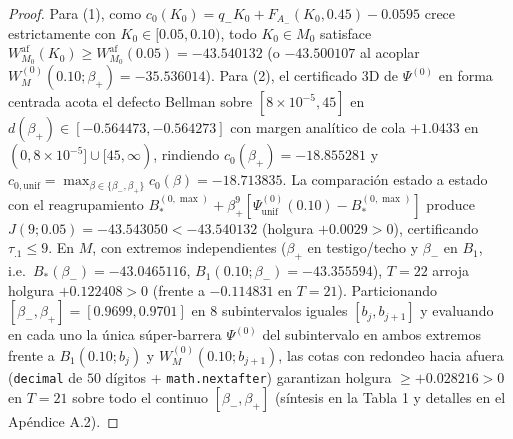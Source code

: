 \documentclass[11pt,letterpaper]{article}
\theoremstyle{plain}
\begin{document}
\begin{proof}
Para (1), como $c_0(K_0)=q_- K_0 + F_{A_-}(K_0,0.45) - 0.0595$ crece estrictamente con $K_0\in[0.05,0.10)$, todo $K_0\in M_0$ satisface $W_{M_0}^{\mathrm{af}}(K_0)\ge W_{M_0}^{\mathrm{af}}(0.05)=-43.540132$ (o $-43.500107$ al acoplar $W_M^{(0)}(0.10;\beta_+)=-35.536014$). Para (2), el certificado 3D de $\Psi^{(0)}$ en forma centrada acota el defecto Bellman sobre $[8\times 10^{-5}, 45]$ en $d(\beta_+)\in[-0.564473,-0.564273]$ con margen analítico de cola $+1.0433$ en $(0,8\times 10^{-5}]\cup[45,\infty)$, rindiendo $c_0(\beta_+)=-18.855281$ y $c_{0,\mathrm{unif}}=\max_{\beta\in\{\beta_-,\beta_+\}} c_0(\beta)=-18.713835$. La comparación estado a estado con el reagrupamiento $B_*^{(0,\max)}+\beta_+^9[\Psi^{(0)}_{\mathrm{unif}}(0.10)-B_*^{(0,\max)}]$ produce $J(9;0.05)=-43.543050 < -43.540132$ (holgura $+0.0029>0$), certificando $\tau_{.1}\le 9$. En $M$, con extremos independientes ($\beta_+$ en testigo/techo y $\beta_-$ en $B_1$, i.e.\ $B_*(\beta_-)=-43.0465116$, $B_1(0.10;\beta_-)=-43.355594$), $T=22$ arroja holgura $+0.122408>0$ (frente a $-0.114831$ en $T=21$). Particionando $[\beta_-,\beta_+]=[0.9699,0.9701]$ en $8$ subintervalos iguales $[b_j,b_{j+1}]$ y evaluando en cada uno la única súper-barrera $\Psi^{(0)}$ del subintervalo en ambos extremos frente a $B_1(0.10;b_j)$ y $W_M^{(0)}(0.10;b_{j+1})$, las cotas con redondeo hacia afuera (\texttt{decimal} de $50$ dígitos + \texttt{math.nextafter}) garantizan holgura $\ge +0.028216 > 0$ en $T=21$ sobre todo el continuo $[\beta_-,\beta_+]$ (síntesis en la Tabla 1 y detalles en el Apéndice A.2).
\end{proof}
\end{document}
